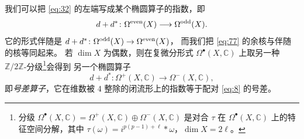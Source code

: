 \documentclass[11pt]{amsart}
\theoremstyle{definition}
\theoremstyle{remark}
\theoremstyle{plain}
\numberwithin{equation}{section}
\renewcommand{\:}{\colon}
\newcommand{\CC}{{\mathbb C}}
\newcommand{\ZZ}{{\mathbb Z}}
\DeclareMathOperator{\coker}{coker}
\newcommand{\zmod}[1]{\ZZ/#1\ZZ}
\newcommand{\zt}{\zmod2}
\DeclareMathOperator{\image}{image}
\begin{document}
我们可以把 \eqref{eq:32} 的左端写成某个椭圆算子的指数，即
  \begin{equation}\label{eq:77}
     d+d^*\:\Omega ^{\textnormal{even}}(X)\longrightarrow \Omega
     ^{\textnormal{odd}}(X).
  \end{equation}
它的形式伴随是
$d+d^*\:\Omega ^{\textnormal{odd}}(X)\to \Omega ^{\textnormal{even}}(X)$，
而我们把 \eqref{eq:77} 的余核与伴随的核等同起来。
若 $\dim X$ 为偶数，则在复微分形式
$\Omega ^{\bullet }(X,\CC)$ 上取另一种
$\zt$-分级\footnote{分级
$\Omega ^{\bullet }(X,\CC)= \Omega ^+(X,\CC)\oplus \Omega ^-(X,\CC)$
是对合 $\tau $ 在 $\Omega ^{\bullet }(X,\CC)$ 上的特征空间分解，其中
$\tau (\omega )= i^{p(p-1)+\ell }*\omega $，$\dim X=2\ell $。}会得到
另一个椭圆算子 \cite[\S6]{AS3}
  \begin{equation}\label{eq:78}
     d+d^*\:\Omega ^+(X,\CC)\longrightarrow \Omega ^-(X,\CC),
  \end{equation}
即\emph{号差算子}，它在维数被 $4$ 整除的闭流形上的指数等于配对
\eqref{eq:8} 的号差。
\end{document}
